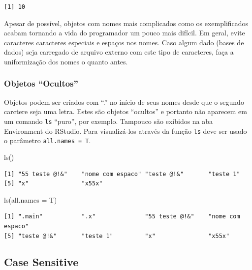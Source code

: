 \documentclass[
  letterpaper,
  DIV=11,
  numbers=noendperiod]{scrreprt}
\newenvironment{Shaded}{\begin{snugshade}}{\end{snugshade}}
\newcommand{\AttributeTok}[1]{\textcolor[rgb]{0.40,0.45,0.13}{#1}}
\newcommand{\FunctionTok}[1]{\textcolor[rgb]{0.28,0.35,0.67}{#1}}
\newcommand{\NormalTok}[1]{\textcolor[rgb]{0.00,0.23,0.31}{#1}}
\begin{document}
\begin{verbatim}
[1] 10
\end{verbatim}

Apesar de possível, objetos com nomes mais complicados como os
exemplificados acabam tornando a vida do programador um pouco mais
difícil. Em geral, evite caracteres caracteres especiais e espaços nos
nomes. Caso algum dado (bases de dados) seja carregado de arquivo
externo com este tipo de caracteres, faça a uniformização dos nomes o
quanto antes.

\hypertarget{objetos-ocultos}{%
\subsubsection{Objetos ``Ocultos''}\label{objetos-ocultos}}

Objetos podem ser criados com ``.'' no início de seus nomes desde que o
segundo carctere seja uma letra. Estes são objetos ``ocultos'' e
portanto não aparecem em um comando \texttt{ls} ``puro'', por exemplo.
Tampouco são exibidos na aba Environment do RStudio. Para visualizá-los
através da função \texttt{ls} deve ser usado o parâmetro
\texttt{all.names\ =\ T}.

\begin{Shaded}
\begin{Highlighting}[]
\FunctionTok{ls}\NormalTok{()}
\end{Highlighting}
\end{Shaded}

\begin{verbatim}
[1] "55 teste @!&"    "nome com espaco" "teste @!&"       "teste 1"        
[5] "x"               "x55x"           
\end{verbatim}

\begin{Shaded}
\begin{Highlighting}[]
\FunctionTok{ls}\NormalTok{(}\AttributeTok{all.names =}\NormalTok{ T)}
\end{Highlighting}
\end{Shaded}

\begin{verbatim}
[1] ".main"           ".x"              "55 teste @!&"    "nome com espaco"
[5] "teste @!&"       "teste 1"         "x"               "x55x"           
\end{verbatim}

\hypertarget{case-sensitive}{%
\subsection{Case Sensitive}\label{case-sensitive}}
\end{document}

